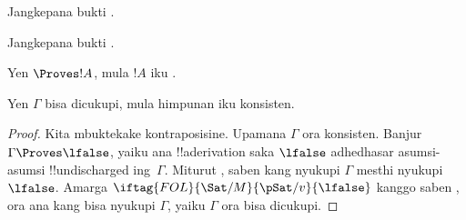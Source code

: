 \documentclass[../../../include/open-logic-section]{subfiles}
\begin{document}
\begin{prob}
Jangkepana bukti .
\end{prob}
\tagendprob

\begin{prob}
Jangkepana bukti .
\end{prob}
\tagendprob

\begin{cor}
Yen $\Proves !A$, mula $!A$ iku .
\end{cor}

\begin{cor}
Yen $\Gamma$ bisa dicukupi, mula himpunan iku konsisten.
\end{cor}

\begin{proof}
Kita mbuktekake kontraposisine. Upamana $\Gamma$ ora konsisten.
Banjur $\Gamma \Proves \lfalse$, yaiku ana !!a{derivation} saka
$\lfalse$ adhedhasar asumsi-asumsi !!{undischarged} ing~$\Gamma$. Miturut
, saben
kang nyukupi $\Gamma$ mesthi nyukupi $\lfalse$. Amarga
$\iftag{FOL}{\Sat/{M}}{\pSat/{v}}{\lfalse}$ kanggo saben
,
ora ana  kang bisa nyukupi
$\Gamma$, yaiku $\Gamma$ ora bisa dicukupi.
\end{proof}
\end{document}
